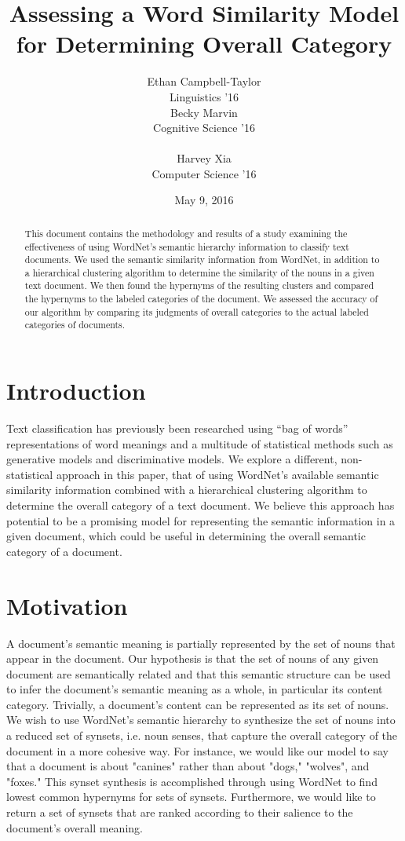 \documentclass[12pt]{article}
\title{Assessing a Word Similarity Model for Determining Overall Category}
\author{Ethan Campbell-Taylor \\
Linguistics '16\\\And
  Becky Marvin \\
  Cognitive Science '16 \\
  \\\And
  Harvey Xia \\
  Computer Science '16 \\}
\date{May 9, 2016}
\begin{document}
\maketitle
\begin{abstract}
  This document contains the methodology and results of a study examining the effectiveness of using WordNet's semantic hierarchy information to classify text documents. We used the semantic similarity information from WordNet, in addition to a hierarchical clustering algorithm to determine the similarity of the nouns in a given text document. We then found the hypernyms of the resulting clusters and compared the hypernyms to the labeled categories of the document. We assessed the accuracy of our algorithm by comparing its judgments of overall categories to the actual labeled categories of documents.
\end{abstract}

\section{Introduction}

Text classification has previously been researched using ``bag of words'' representations of word meanings and a multitude of statistical methods such as generative models and discriminative models. We explore a different, non-statistical approach in this paper, that of using WordNet's available semantic similarity information combined with a hierarchical clustering algorithm to determine the overall category of a text document. We believe this approach has potential to be a promising model for representing the semantic information in a given document, which could be useful in determining the overall semantic category of a document.

\section{Motivation}

A document's semantic meaning is partially represented by the set of nouns that appear in the document. Our hypothesis is that the set of nouns of any given document are semantically related and that this semantic structure can be used to infer the document's semantic meaning as a whole, in particular its content category. Trivially, a document's content can be represented as its set of nouns. We wish to use WordNet's semantic hierarchy to synthesize the set of nouns into a reduced set of synsets, i.e. noun senses, that capture the overall category of the document in a more cohesive way. For instance, we would like our model to say that a document is about "canines" rather than about "dogs," "wolves", and "foxes." This synset synthesis is accomplished through using WordNet to find lowest common hypernyms for sets of synsets. Furthermore, we would like to return a set of synsets that are ranked according to their salience to the document's overall meaning.
\end{document}
